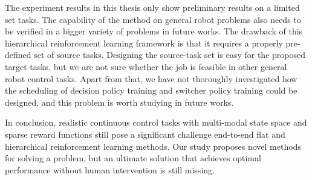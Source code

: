 The experiment results in this thesis only show preliminary results on a limited set tasks. The capability of the method on general robot problems also needs to be verified in a bigger variety of problems in future works. The drawback of this hierarchical reinforcement learning framework is that it requires a properly pre-defined set of source tasks. Designing the source-task set is easy for the proposed target tasks, but we are not sure whether the job is feasible in other general robot control tasks. Apart from that, we have not thoroughly investigated how the scheduling of decision policy training and switcher policy training could be designed, and this problem is worth studying in future works.

In conclusion, realistic continuous control tasks with multi-modal state space and sparse reward functions still pose a significant challenge end-to-end flat and hierarchical reinforcement learning methods. Our study proposes novel methods for solving a problem, but an ultimate solution that achieves optimal performance without human intervention is still missing.